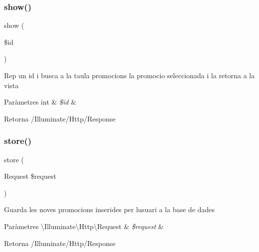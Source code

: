 \subsubsection{\texorpdfstring{show()}{show()}}
{\footnotesize\ttfamily show (\begin{DoxyParamCaption}\item[{}]{\$id }\end{DoxyParamCaption})}

Rep un id i busca a la taula promocions la promocio seleccionada i la retorna a la vista


\begin{DoxyParams}[1]{Paràmetres}
int & {\em \$id} & \\
\hline
\end{DoxyParams}
\begin{DoxyReturn}{Retorna}
/\+Illuminate/\+Http/\+Response 
\end{DoxyReturn}
\mbox{\label{class_app_1_1_http_1_1_controllers_1_1_promocions_controller_a9ef485163104597c12185b53cdacf638}} 
\subsubsection{\texorpdfstring{store()}{store()}}
{\footnotesize\ttfamily store (\begin{DoxyParamCaption}\item[{Request}]{\$request }\end{DoxyParamCaption})}

Guarda les noves promocions inserides per l\textquotesingle{}usuari a la base de dades


\begin{DoxyParams}[1]{Paràmetres}
\textbackslash{}\+Illuminate\textbackslash{}\+Http\textbackslash{}\+Request & {\em \$request} & \\
\hline
\end{DoxyParams}
\begin{DoxyReturn}{Retorna}
/\+Illuminate/\+Http/\+Response 
\end{DoxyReturn}
\mbox{\label{class_app_1_1_http_1_1_controllers_1_1_promocions_controller_affb03cc19897a1800a0f411264d6c7cc}} 
